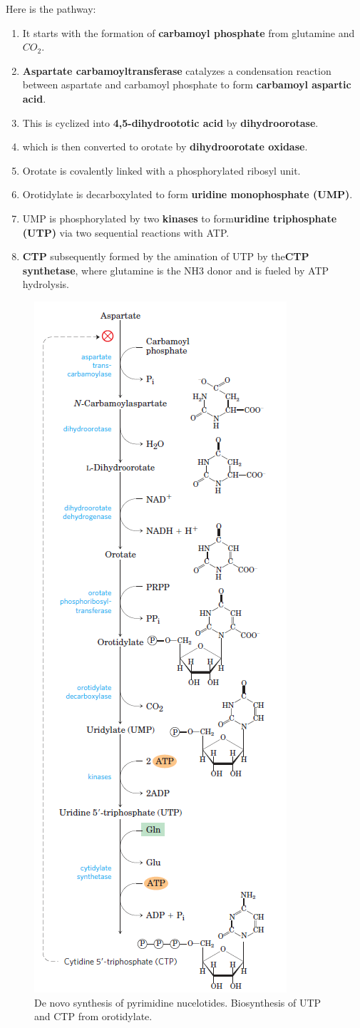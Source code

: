 \documentclass[../main.tex]{subfiles}
\begin{document}
Here is the pathway:
\begin{enumerate}
	\item It starts with the formation of \textbf{\gls{carbamoyl phosphate}} from glutamine and $CO_{2}$.
	\item \textbf{\gls{Aspartate carbamoyltransferase}} catalyzes a condensation reaction between aspartate and carbamoyl phosphate to form \textbf{\gls{carbamoyl aspartic acid}}.
	\item This is cyclized into \textbf{\gls{4,5-dihydroototic acid}} by \textbf{\gls{dihydroorotase}}. 
	\item which is then converted to orotate by \textbf{\gls{dihydroorotate oxidase}}.
	\item Orotate is covalently linked with a phosphorylated ribosyl unit.
	\item Orotidylate is decarboxylated to form \textbf{\gls{uridine monophosphate (UMP)}}.
	\item UMP is phosphorylated by two \textbf{\gls{kinases}} to form\textbf{\gls{uridine triphosphate (UTP)}} via two sequential reactions with ATP.
	\item \textbf{\gls{CTP}} subsequently formed by the amination of UTP by the\textbf{\gls{CTP synthetase}}, where glutamine is the NH3 donor and is fueled by ATP hydrolysis.
\end{enumerate}

\begin{figure}[H]
	\centering
	\includegraphics[width=0.3\linewidth]{pyri_path}
	\caption{De novo synthesis of pyrimidine nucelotides. Biosynthesis of UTP and CTP from orotidylate.}
	\label{fig:pyripath}
\end{figure}
\end{document}
